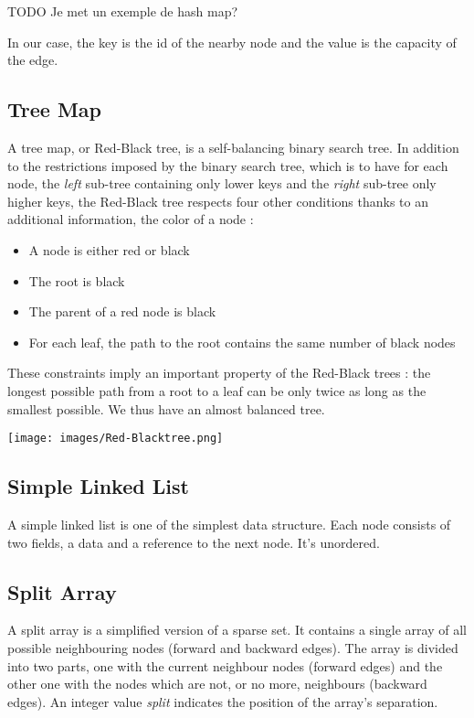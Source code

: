 TODO Je met un exemple de hash map? \newline

In our case, the key is the id of the nearby node and the value is the capacity of the edge.

\subsection{Tree Map}
A tree map, or Red-Black tree, is a self-balancing binary search tree. In addition to the restrictions imposed by the binary search tree, which is to have for each node, the \textit{left} sub-tree containing only lower keys and the \textit{right} sub-tree only higher keys, the Red-Black tree respects four other conditions thanks to an additional information, the color of a node :

\begin{itemize}
\item A node is either red or black
\item The root is black
\item The parent of a red node is black
\item For each leaf, the path to the root contains the same number of black nodes
\end{itemize}

These constraints imply an important property of the Red-Black trees : the longest possible path from a root to a leaf can be only twice as long as the smallest possible. We thus have an almost balanced tree.

\begin{center}
\texttt{[image: images/Red-Blacktree.png]}
\end{center}

\subsection{Simple Linked List}
A simple linked list is one of the simplest data structure. Each node consists of two fields, a data and a reference to the next node. It's unordered.

\subsection{Split Array}
A split array is a simplified version of a sparse set. It contains a single array of all possible neighbouring nodes (forward and backward edges). The array is divided into two parts, one with the current neighbour nodes (forward edges) and the other one with the nodes which are not, or no more, neighbours (backward edges). An integer value \textit{split} indicates the position of the array's separation.


